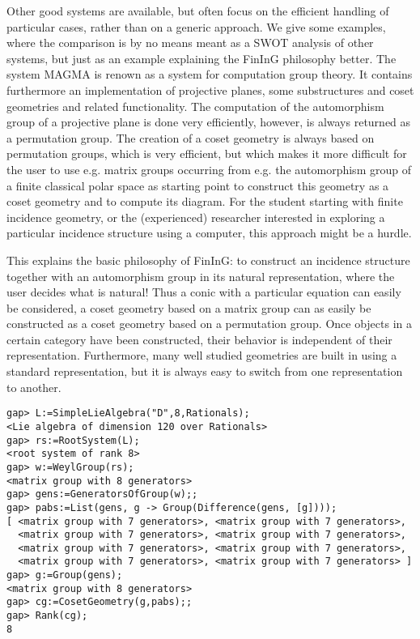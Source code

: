 \documentclass{article}
\def\fining{{\sf FinInG}}
\begin{document}
Other good systems are available, but often focus on the efficient handling of particular cases, rather than on a generic approach.
We give some examples, where the comparison is by no means meant as a SWOT analysis of other systems, but just as an example
explaining the \fining{} philosophy better. The system {\sf MAGMA} \cite{magma} is renown as a system for computation group theory. It contains
furthermore an implementation of projective planes, some substructures and coset geometries and related functionality. The computation
of the automorphism group of a projective plane is done very efficiently, however, is always returned as a permutation group. The creation
of a coset geometry is always based on permutation groups, which is very efficient, but which makes it more difficult for the user to 
use e.g. matrix groups occurring from e.g. the automorphism group of a finite classical polar space as starting point to construct this geometry
as a coset geometry and to compute its diagram. For the student starting with finite incidence geometry, or the (experienced) researcher interested
in exploring a particular incidence structure using a computer, this approach might be a hurdle. 

This explains the basic philosophy of \fining{}: to construct an incidence structure together with an automorphism group 
in its natural representation, where the user decides what is natural! Thus a conic with a particular equation can easily be considered,
a coset geometry based on a matrix group can as easily be constructed as a coset geometry based on a permutation group. Once objects
in a certain category have been constructed, their behavior is independent of their representation. Furthermore, many well studied
geometries are built in using a standard representation, but it is always easy to switch from one representation to another.

\begin{verbatim}
gap> L:=SimpleLieAlgebra("D",8,Rationals);
<Lie algebra of dimension 120 over Rationals>
gap> rs:=RootSystem(L);
<root system of rank 8>
gap> w:=WeylGroup(rs);
<matrix group with 8 generators>
gap> gens:=GeneratorsOfGroup(w);;
gap> pabs:=List(gens, g -> Group(Difference(gens, [g])));
[ <matrix group with 7 generators>, <matrix group with 7 generators>, 
  <matrix group with 7 generators>, <matrix group with 7 generators>, 
  <matrix group with 7 generators>, <matrix group with 7 generators>, 
  <matrix group with 7 generators>, <matrix group with 7 generators> ]
gap> g:=Group(gens);
<matrix group with 8 generators>
gap> cg:=CosetGeometry(g,pabs);;
gap> Rank(cg);
8
\end{verbatim}
\end{document}
